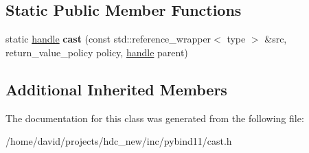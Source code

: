 \subsection*{Static Public Member Functions}
\begin{DoxyCompactItemize}
\item 
static \hyperlink{classhandle}{handle} {\bfseries cast} (const std\+::reference\+\_\+wrapper$<$ type $>$ \&src, return\+\_\+value\+\_\+policy policy, \hyperlink{classhandle}{handle} parent)\hypertarget{classtype__caster_3_01std_1_1reference__wrapper_3_01type_01_4_01_4_a345e25ad868cc4b8659dbe1c7f3b1153}{}\label{classtype__caster_3_01std_1_1reference__wrapper_3_01type_01_4_01_4_a345e25ad868cc4b8659dbe1c7f3b1153}

\end{DoxyCompactItemize}
\subsection*{Additional Inherited Members}


The documentation for this class was generated from the following file\+:\begin{DoxyCompactItemize}
\item 
/home/david/projects/hdc\+\_\+new/inc/pybind11/cast.\+h\end{DoxyCompactItemize}

